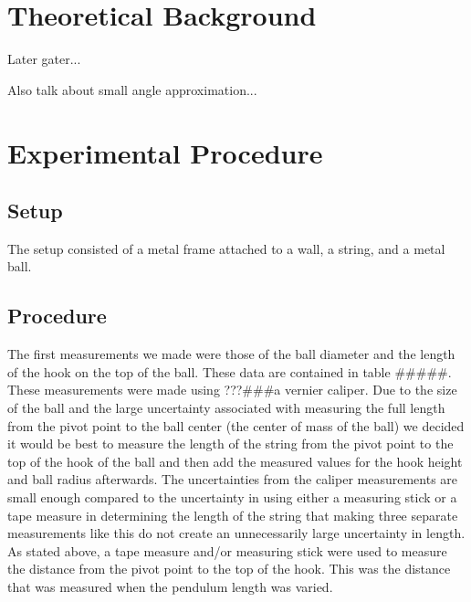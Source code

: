 \documentclass[iop]{emulateapj}
\begin{document}
\section{Theoretical Background}
\label{sec:theory}


Later gater...

Also talk about small angle approximation...






\section{Experimental Procedure}
\label{sec:procedure}

\subsection{Setup}

The setup consisted of a metal frame attached to a wall, a string, and a metal 
ball.

\subsection{Procedure}

The first measurements we made were those of the ball diameter and the length 
of the hook on the top of the ball.  These data are contained in table \#\#\#\#\#. 
These measurements were made using ???\#\#\#a vernier caliper.  Due to the size of 
the ball and the large uncertainty associated with measuring the full length 
from the pivot point to the ball center (the center of mass of the
ball) we decided it would be best to measure the length of the string from the
pivot point to the top of the hook of the ball and then add the measured values 
for the hook height and ball radius afterwards.  The uncertainties from the 
caliper measurements are small enough compared to the uncertainty in using 
either a measuring stick or a tape measure in determining the length of the
string that making three separate measurements like this do not create an 
unnecessarily large uncertainty in length.  As stated above, a tape measure 
and/or measuring stick were used to measure the distance from the pivot point
to the top of the hook.  This was the distance that was measured when the
pendulum length was varied.
\end{document}
